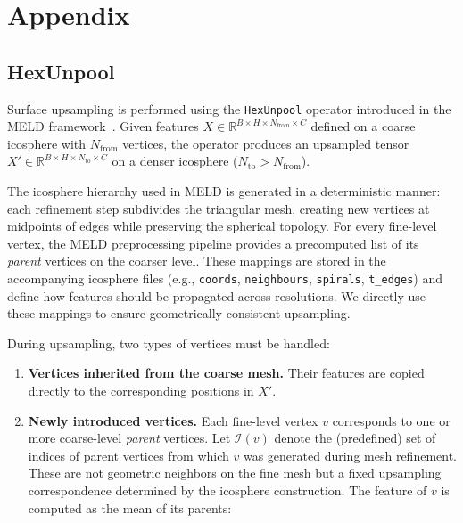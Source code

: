 \documentclass[FCD_GNN.tex]{subfiles}
\begin{document}
\chapter{Appendix}

\section*{HexUnpool} \label{sec:hexunpool}

Surface upsampling is performed using the \texttt{HexUnpool} operator introduced in the MELD framework~\cite{Ripart2025MELD}.
Given features 
$X \in \mathbb{R}^{B \times H \times N_{\text{from}} \times C}$ 
defined on a coarse icosphere with $N_{\text{from}}$ vertices, the operator 
produces an upsampled tensor 
$X' \in \mathbb{R}^{B \times H \times N_{\text{to}} \times C}$ 
on a denser icosphere ($N_{\text{to}} > N_{\text{from}}$).

The icosphere hierarchy used in MELD is generated in a deterministic manner:
each refinement step subdivides the triangular mesh, creating new vertices at 
midpoints of edges while preserving the spherical topology.
For every fine-level vertex, the MELD preprocessing pipeline provides a
precomputed list of its \emph{parent} vertices on the coarser level.
These mappings are stored in the accompanying icosphere files 
(e.g., \texttt{coords}, \texttt{neighbours}, \texttt{spirals}, 
\texttt{t\_edges}) and define how features should be propagated across 
resolutions. We directly use these mappings to ensure geometrically consistent
upsampling.

During upsampling, two types of vertices must be handled:

\begin{enumerate}
  \item \textbf{Vertices inherited from the coarse mesh.}  
        Their features are copied directly to the corresponding positions in 
        $X'$.

  \item \textbf{Newly introduced vertices.}  
        Each fine-level vertex $v$ corresponds to one or more coarse-level
        \emph{parent} vertices.  
        Let $\mathcal{I}(v)$ denote the (predefined) set of indices of parent
        vertices from which $v$ was generated during mesh refinement.
        These are not geometric neighbors on the fine mesh but a fixed
        upsampling correspondence determined by the icosphere construction.
        The feature of $v$ is computed as the mean of its parents:
\end{enumerate}
\end{document}
